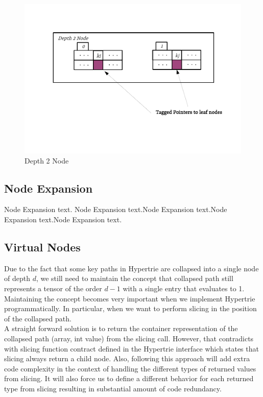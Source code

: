 \begin{figure}
	\centering
	\vspace{-1in}
	\includegraphics{figures/chapter4/depth2}
	\caption{Depth 2 Node}
	\label{fig:compressed_depth_2_node}
\end{figure}

\subsection{Node Expansion}
Node Expansion text. Node Expansion text.Node Expansion text.Node Expansion text.Node Expansion text.

\subsection{Virtual Nodes}
Due to the fact that some key paths in Hypertrie are collapsed into a single node of depth $d$, we still need to maintain the concept that collapsed path still represents a tensor of the order $d-1$ with a single entry that evaluates to 1. Maintaining the concept becomes very important when we implement Hypertrie programmatically. In particular, when we want to perform slicing in the position of the collapsed path. \\

A straight forward solution is to return the container representation of the collapsed path (array, int value) from the slicing call. However, that contradicts with slicing function contract defined in the Hypertrie interface which states that slicing always return a child node. Also, following this approach will add extra code complexity in the context of handling the different types of returned values from slicing. It will also force us to define a different behavior for each returned type from slicing resulting in substantial amount of code redundancy.  \\

